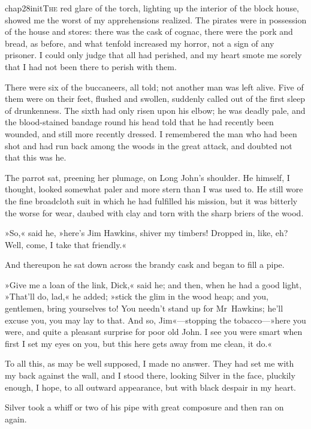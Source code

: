 
\lettrine[lines=5,image=true,findent=2pt]{chap28initT}{he} red glare of the torch, lighting up the interior of the block house, showed me the worst of my apprehensions realized. The pirates were in possession of the house and stores: there was the cask of cognac, there were the pork and bread, as before, and what tenfold increased my horror, not a sign of any prisoner. I could only judge that all had perished, and my heart smote me sorely that I had not been there to perish with them.

There were six of the buccaneers, all told; not another man was left alive. Five of them were on their feet, flushed and swollen, suddenly called out of the first sleep of drunkenness. The sixth had only risen upon his elbow; he was deadly pale, and the blood-stained bandage round his head told that he had recently been wounded, and still more recently dressed. I remembered the man who had been shot and had run back among the woods in the great attack, and doubted not that this was he.

The parrot sat, preening her plumage, on Long John's shoulder. He himself, I thought, looked somewhat paler and more stern than I was used to. He still wore the fine broadcloth suit in which he had fulfilled his mission, but it was bitterly the worse for wear, daubed with clay and torn with the sharp briers of the wood.

»So,« said he, »here's Jim Hawkins, shiver my timbers! Dropped in, like, eh? Well, come, I take that friendly.«

And thereupon he sat down across the brandy cask and began to fill a pipe.

»Give me a loan of the link, Dick,« said he; and then, when he had a good light, »That'll do, lad,« he added; »stick the glim in the wood heap; and you, gentlemen, bring yourselves to! You needn't stand up for Mr~Hawkins; he'll excuse you, you may lay to that. And so, Jim«—stopping the tobacco—»here you were, and quite a pleasant surprise for poor old John. I see you were smart when first I set my eyes on you, but this here gets away from me clean, it do.«

To all this, as may be well supposed, I made no answer. They had set me with my back against the wall, and I stood there, looking Silver in the face, pluckily enough, I hope, to all outward appearance, but with black despair in my heart.

Silver took a whiff or two of his pipe with great composure and then ran on again.

